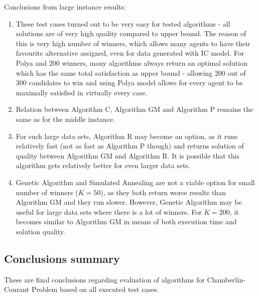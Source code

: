 Conclusions from large instance results:
\begin{enumerate}
	\item These test cases turned out to be very easy for tested algorithms - all solutions are of very high quality compared to upper bound. The reason of this is very high number of winners, which allows many agents to have their favourite alternative assigned, even for data generated with IC model. For Polya and 200 winners, many algorithms always return an optimal solution which has the same total satisfaction as upper bound - allowing 200 out of 300 candidates to win and using Polya model allows for every agent to be maximally satisfied in virtually every case.
	\item Relation between Algorithm C, Algorithm GM and Algorithm P remains the same as for the middle instance.
	\item For such large data sets, Algorithm R may become an option, as it runs relatively fast (not as fast as Algorithm P though) and returns solution of quality between Algorithm GM and Algorithm R. It is possible that this algorithm gets relatively better for even larger data sets.
	\item Genetic Algorithm and Simulated Annealing are not a viable option for small number of winners ($K = 50$), as they both return worse results than Algorithm GM and they run slower. However, Genetic Algorithm may be useful for large data sets where there is a lot of winners. For $K = 200$, it becomes similar to Algorithm GM in means of both execution time and solution quality.
\end{enumerate}

\subsection{Conclusions summary}

These are final conclusions regarding evaluation of algorithms for Chamberlin-Courant Problem based on all executed test cases.

